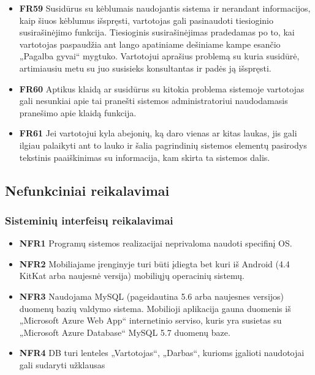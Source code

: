 \documentclass{VUMIFPSbakalaurinis}
\begin{document}
\begin{itemize}
	\item \textbf{FR59} Susidūrus su kėblumais naudojantis sistema ir nerandant informacijos, kaip šiuos kėblumus išspręsti, vartotojas gali pasinaudoti tiesioginio susirašinėjimo funkcija. Tiesioginis susirašinėjimas pradedamas po to, kai vartotojas paspaudžia ant lango apatiniame dešiniame kampe esančio „Pagalba gyvai“ mygtuko. Vartotojui aprašius problemą su kuria susidūrė, artimiausiu metu su juo susisieks konsultantas ir padės ją išspręsti.
\end{itemize}

\begin{itemize}
	\item \textbf{FR60} Aptikus klaidą ar susidūrus su kitokia problema sistemoje vartotojas gali nesunkiai apie tai pranešti sistemos administratoriui naudodamasis pranešimo apie klaidą funkcija.
\end{itemize}

\begin{itemize}
	\item \textbf{FR61} Jei vartotojui kyla abejonių, ką daro vienas ar kitas laukas, jis gali ilgiau palaikyti ant to lauko ir šalia pagrindinių sistemos elementų pasirodys tekstinis paaiškinimas su informacija, kam skirta ta sistemos dalis.
\end{itemize}

\subsection{Nefunkciniai reikalavimai}
\subsubsection{Sisteminių interfeisų reikalavimai}
\begin{itemize}
	\item \textbf{NFR1} Programų sistemos realizacijai neprivaloma naudoti specifinį OS.
	\item \textbf{NFR2} Mobiliajame įrenginyje turi būti įdiegta bet kuri iš Android (4.4 KitKat arba naujesnė versija) mobiliųjų operacinių sistemų.
\end{itemize}

\begin{itemize}
	\item \textbf{NFR3} Naudojama MySQL (pageidautina 5.6 arba naujesnes versijos) duomenų bazių valdymo sistema. Mobilioji aplikacija gauna duomenis iš „Microsoft Azure Web App“ internetinio serviso, kuris yra susietas su „Microsoft Azure Database“ MySQL 5.7 duomenų baze.
	\item \textbf{NFR4} DB turi lenteles „Vartotojas“, „Darbas“, kurioms įgalioti naudotojai gali sudaryti užklausas
\end{itemize}
\end{document}
